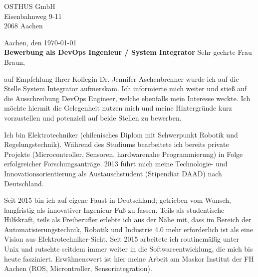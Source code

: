 \documentclass[a4paper,10pt]{article}
\begin{document}
\pagestyle{fancyplain} %
\thispagestyle{empty} %



\pagebreak

\pagestyle{fancyplain} %

OSTHUS GmbH \\
Eisenbahnweg 9-11 \\
2068 Aachen 

\hfill
Aachen, den \today
\vspace{0.05cm}
\\



\textbf{Bewerbung als DevOps Ingenieur / System Integrator} \vfill
Sehr geehrte Frau Braun,\vfill

auf Empfehlung Ihrer Kollegin Dr. Jennifer Aschenbrenner wurde ich auf die Stelle System Integrator aufmerskam. Ich informierte mich weiter und stieß auf die Ausschreibung DevOps Engineer, welche ebenfalls mein Interesse weckte. Ich möchte hiermit die Gelegenheit nutzen mich und meine Hintergründe kurz vorzustellen und potenziell auf beide Stellen zu bewerben. 

Ich bin Elektrotechniker (chilenisches Diplom mit Schwerpunkt Robotik und Regelungstechnik). Während des Studiums bearbeitete ich bereits private Projekte (Microcontroller, Sensoren, hardwarenahe Programmierung) in Folge erfolgreicher Forschungsanträge. 2013 führt mich meine Technologie- und Innovationsorientierung als Austauschstudent (Stipendiat DAAD) nach Deutschland.\vfill

Seit 2015 bin ich auf eigene Faust in Deutschland; getrieben vom Wunsch, langfristig als innovativer Ingenieur Fuß zu fassen. Teils als studentische Hilfskraft, teils als Freiberufler erlebte ich aus der Nähe mit, dass im Bereich der Automatisierungstechnik, Robotik und Industrie 4.0 mehr erforderlich ist als eine Vision aus Elektrotechniker-Sicht. Seit 2015 arbeitete ich routinemäßig unter Unix und rutschte seitdem immer weiter in die Softwareentwicklung, die mich bis heute fasziniert. Erwähnenswert ist hier meine Arbeit am Maskor Institut der FH Aachen (ROS, Microntroller, Sensorintegration). \vfill
 
\end{document}

